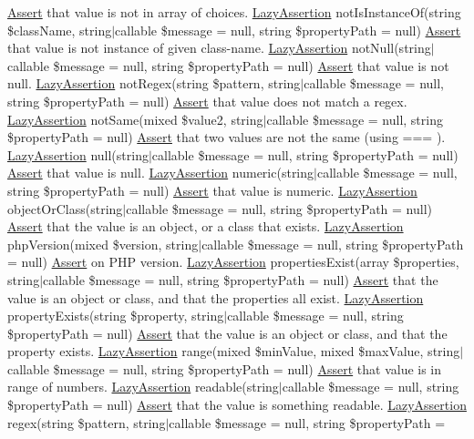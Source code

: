 \mbox{\hyperlink{class_assert_1_1_assert}{Assert}} that value is not in array of choices.  \mbox{\hyperlink{class_assert_1_1_lazy_assertion}{Lazy\+Assertion}} not\+Is\+Instance\+Of(string \$class\+Name, string$\vert$callable \$message = null, string \$property\+Path = null) \mbox{\hyperlink{class_assert_1_1_assert}{Assert}} that value is not instance of given class-\/name.  \mbox{\hyperlink{class_assert_1_1_lazy_assertion}{Lazy\+Assertion}} not\+Null(string$\vert$callable \$message = null, string \$property\+Path = null) \mbox{\hyperlink{class_assert_1_1_assert}{Assert}} that value is not null.  \mbox{\hyperlink{class_assert_1_1_lazy_assertion}{Lazy\+Assertion}} not\+Regex(string \$pattern, string$\vert$callable \$message = null, string \$property\+Path = null) \mbox{\hyperlink{class_assert_1_1_assert}{Assert}} that value does not match a regex.  \mbox{\hyperlink{class_assert_1_1_lazy_assertion}{Lazy\+Assertion}} not\+Same(mixed \$value2, string$\vert$callable \$message = null, string \$property\+Path = null) \mbox{\hyperlink{class_assert_1_1_assert}{Assert}} that two values are not the same (using === ).  \mbox{\hyperlink{class_assert_1_1_lazy_assertion}{Lazy\+Assertion}} null(string$\vert$callable \$message = null, string \$property\+Path = null) \mbox{\hyperlink{class_assert_1_1_assert}{Assert}} that value is null.  \mbox{\hyperlink{class_assert_1_1_lazy_assertion}{Lazy\+Assertion}} numeric(string$\vert$callable \$message = null, string \$property\+Path = null) \mbox{\hyperlink{class_assert_1_1_assert}{Assert}} that value is numeric.  \mbox{\hyperlink{class_assert_1_1_lazy_assertion}{Lazy\+Assertion}} object\+Or\+Class(string$\vert$callable \$message = null, string \$property\+Path = null) \mbox{\hyperlink{class_assert_1_1_assert}{Assert}} that the value is an object, or a class that exists.  \mbox{\hyperlink{class_assert_1_1_lazy_assertion}{Lazy\+Assertion}} php\+Version(mixed \$version, string$\vert$callable \$message = null, string \$property\+Path = null) \mbox{\hyperlink{class_assert_1_1_assert}{Assert}} on P\+HP version.  \mbox{\hyperlink{class_assert_1_1_lazy_assertion}{Lazy\+Assertion}} properties\+Exist(array \$properties, string$\vert$callable \$message = null, string \$property\+Path = null) \mbox{\hyperlink{class_assert_1_1_assert}{Assert}} that the value is an object or class, and that the properties all exist.  \mbox{\hyperlink{class_assert_1_1_lazy_assertion}{Lazy\+Assertion}} property\+Exists(string \$property, string$\vert$callable \$message = null, string \$property\+Path = null) \mbox{\hyperlink{class_assert_1_1_assert}{Assert}} that the value is an object or class, and that the property exists.  \mbox{\hyperlink{class_assert_1_1_lazy_assertion}{Lazy\+Assertion}} range(mixed \$min\+Value, mixed \$max\+Value, string$\vert$callable \$message = null, string \$property\+Path = null) \mbox{\hyperlink{class_assert_1_1_assert}{Assert}} that value is in range of numbers.  \mbox{\hyperlink{class_assert_1_1_lazy_assertion}{Lazy\+Assertion}} readable(string$\vert$callable \$message = null, string \$property\+Path = null) \mbox{\hyperlink{class_assert_1_1_assert}{Assert}} that the value is something readable.  \mbox{\hyperlink{class_assert_1_1_lazy_assertion}{Lazy\+Assertion}} regex(string \$pattern, string$\vert$callable \$message = null, string \$property\+Path = 